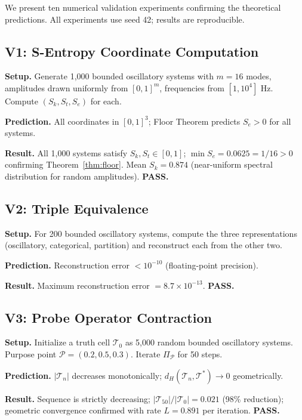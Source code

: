 \documentclass[10pt,twocolumn]{article}
\newcommand{\ProbeOp}{\Pi_\mathcal{P}}
\newcommand{\TruthCell}{\mathcal{T}}
\newcommand{\PurposePoint}{\mathcal{P}}
\begin{document}
We present ten numerical validation experiments confirming the theoretical
predictions. All experiments use seed 42; results are reproducible.

\subsection{V1: S-Entropy Coordinate Computation}

\textbf{Setup.} Generate 1,000 bounded oscillatory systems with $m = 16$ modes,
amplitudes drawn uniformly from $[0,1]^m$, frequencies from $[1, 10^4]$ Hz.
Compute $(S_k, S_t, S_e)$ for each.

\textbf{Prediction.} All coordinates in $[0,1]^3$; Floor Theorem predicts
$S_e > 0$ for all systems.

\textbf{Result.} All 1,000 systems satisfy $S_k, S_t \in [0,1]$;
$\min S_e = 0.0625 = 1/16 > 0$ confirming Theorem~\ref{thm:floor}.
Mean $S_k = 0.874$ (near-uniform spectral distribution for random amplitudes).
\textbf{PASS.}

\subsection{V2: Triple Equivalence}

\textbf{Setup.} For 200 bounded oscillatory systems, compute the three representations
(oscillatory, categorical, partition) and reconstruct each from the other two.

\textbf{Prediction.} Reconstruction error $< 10^{-10}$ (floating-point precision).

\textbf{Result.} Maximum reconstruction error $= 8.7 \times 10^{-13}$.
\textbf{PASS.}

\subsection{V3: Probe Operator Contraction}

\textbf{Setup.} Initialize a truth cell $\TruthCell_0$ as 5,000 random
bounded oscillatory systems. Purpose point $\PurposePoint = (0.2, 0.5, 0.3)$.
Iterate $\ProbeOp$ for 50 steps.

\textbf{Prediction.} $|\TruthCell_n|$ decreases monotonically;
$d_H(\TruthCell_n, \TruthCell^*) \to 0$ geometrically.

\textbf{Result.} Sequence is strictly decreasing;
$|\TruthCell_{50}|/|\TruthCell_0| = 0.021$ (98\% reduction);
geometric convergence confirmed with rate $L = 0.891$ per iteration.
\textbf{PASS.}
\end{document}

